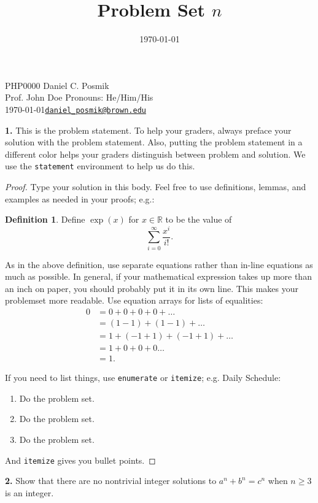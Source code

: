 \documentclass[12pt]{amsart}
\title{Problem Set $n$} %
\date{\today}
\newenvironment{statement}[1]{\smallskip\noindent\color[rgb]{1.00,0.00,0.50} {\bf #1.}}{}
\theoremstyle{definition}
\newtheorem{defn}[theorem]{Definition}
\theoremstyle{remark}
\newcommand{\BR}{\mathbb R}
\begin{document}
\begin{framed}
\maketitle 

\vspace*{-0.25in} \noindent
PHP0000 \hfill Daniel C. Posmik \\ 
Prof. John Doe \hfill{Pronouns: He/Him/His} \\
\today \hfill {\href{mailto:daniel_posmik@brown.edu}{{\tt daniel\_posmik@brown.edu}}}
\end{framed}

\begin{statement}{1}
    This is the problem statement. To help your graders, always preface your solution with the problem statement. Also, putting the problem statement in a different color helps your graders distinguish between problem and solution. We use the {\tt statement} environment to help us do this.
\end{statement}

\begin{proof}
    Type your solution in this body. Feel free to use definitions, lemmas, and examples as needed in your proofs; e.g.:
    \begin{defn}
        Define $\exp(x)$ for $x \in \BR$ to be the value of $$\sum_{i = 0}^\infty\frac{x^i}{i!}.$$
    \end{defn}
    As in the above definition, use separate equations rather than in-line equations as much as possible. In general, if your mathematical expression takes up more than an inch on paper, you should probably put it in its own line. This makes your problemset more readable. Use equation arrays for lists of equalities:
    \begin{align*}
        0 &= 0 + 0 + 0 + 0 + \dots\\
        &= (1 - 1) + (1 - 1) + \dots \\
        &= 1 + (-1 + 1) + (-1 + 1) + \dots \\
        &= 1 + 0 + 0 + 0 \dots \\
        &= 1.
    \end{align*}

    If you need to list things, use {\tt enumerate} or {\tt itemize}; e.g. Daily Schedule:
    \begin{enumerate}
        \item Do the problem set.
        \item Do the problem set.
        \item Do the problem set.
    \end{enumerate}
    And {\tt itemize} gives you bullet points.
\end{proof}

\begin{statement}{2}
    Show that there are no nontrivial integer solutions to $a^n + b^n = c^n$ when $n\ge 3$ is an integer.
\end{statement}
\end{document}
